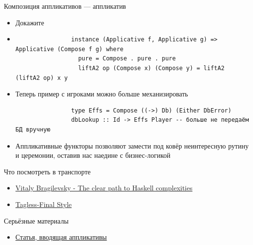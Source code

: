     \begin{frame}[fragile]{Композиция аппликативов --- аппликатив}
        \begin{itemize}
            \item[\todo] Докажите
            \item[\answer] \pause
            \begin{verbatim}
                instance (Applicative f, Applicative g) => Applicative (Compose f g) where
                  pure = Compose . pure . pure
                  liftA2 op (Compose x) (Compose y) = liftA2 (liftA2 op) x y
            \end{verbatim}
            \item Теперь пример с игроками можно больше механизировать
            \begin{verbatim}
                type Effs = Compose ((->) Db) (Either DbError)
                dbLookup :: Id -> Effs Player -- больше не передаём БД вручную
            \end{verbatim}
            \item[\NB] Аппликативные функторы позволяют замести под ковёр неинтересную рутину и церемонии, оставив нас наедине с бизнес-логикой
        \end{itemize}
    \end{frame}


    \begin{frame}[fragile]{Что посмотреть в транспорте}
        \begin{itemize}
            \item \href{https://youtu.be/n3H_YipBDrY?si=bsR5Fj56GEAIpAGE}{\color{blue} Vitaly Bragilevsky - The clear path to Haskell complexities}
            \item \href{https://youtu.be/MbFqJ2NHS8M?si=LamIrSnrjbwCYrt2}{\color{blue}  Tagless-Final Style}
        \end{itemize}
    \end{frame}

    \begin{frame}[fragile]{Серьёзные материалы}
        \begin{itemize}
            \item \href{https://www.staff.city.ac.uk/~ross/papers/Applicative.html}{\color{blue}Статья, вводящая аппликативы}
        \end{itemize}
    \end{frame}


